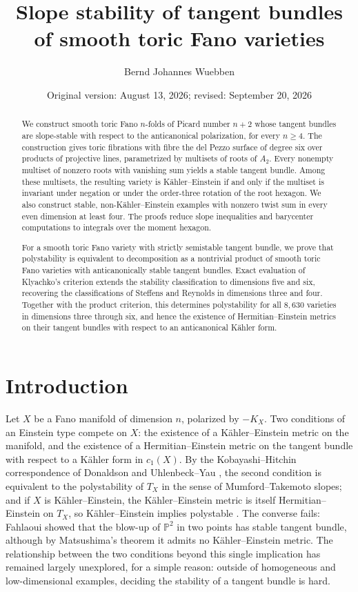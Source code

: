 \documentclass[11pt]{amsart}
\title[Stability of tangent bundles of smooth toric Fanos]{Slope stability
of tangent bundles\\ of smooth toric Fano varieties}
\author{Bernd Johannes Wuebben}
\date{Original version: August 13, 2026; revised: September 20, 2026}
\theoremstyle{definition}
\theoremstyle{remark}
\newcommand{\PP}{\mathbb{P}}
\begin{document}
\begin{abstract}
We construct smooth toric Fano $n$-folds of Picard number $n+2$ whose
tangent bundles are slope-stable with respect to the anticanonical
polarization, for every $n\ge4$. The construction gives toric fibrations
with fibre the del Pezzo surface of degree six over products of projective
lines, parametrized by multisets of roots of $A_2$. Every nonempty multiset
of nonzero roots with vanishing sum yields a stable tangent bundle. Among
these multisets, the resulting variety is K\"ahler--Einstein if and only
if the multiset is invariant under negation or under the order-three
rotation of the root hexagon. We also construct stable,
non-K\"ahler--Einstein examples with nonzero twist sum in every even
dimension at least four. The proofs reduce slope inequalities and
barycenter computations to integrals over the moment hexagon.

For a smooth toric Fano variety with strictly semistable tangent bundle,
we prove that polystability is equivalent to decomposition as a nontrivial
product of smooth toric Fano varieties with anticanonically stable tangent
bundles. Exact evaluation of Klyachko's criterion extends the stability
classification to dimensions five and six, recovering the classifications
of Steffens and Reynolds in dimensions three and four. Together with the
product criterion, this determines polystability for all $8{,}630$
varieties in dimensions three through six, and hence the existence of
Hermitian--Einstein metrics on their tangent bundles with respect to an
anticanonical K\"ahler form.
\end{abstract}

\maketitle

\section{Introduction}

Let $X$ be a Fano manifold of dimension $n$, polarized by $-K_X$. Two
conditions of an Einstein type compete on $X$: the existence of a
K\"ahler--Einstein metric on the manifold, and the existence of a
Hermitian--Einstein metric on the tangent bundle with respect to a K\"ahler
form in $c_1(X)$. By the Kobayashi--Hitchin correspondence of
Donaldson and Uhlenbeck--Yau \cite{Donaldson1985,UhlenbeckYau1986}, the
second condition is equivalent to the polystability of $T_X$ in the sense
of Mumford--Takemoto slopes; and if $X$ is K\"ahler--Einstein, the
K\"ahler--Einstein metric is itself Hermitian--Einstein on $T_X$, so
K\"ahler--Einstein implies polystable
\cite{Kobayashi1987,Lubke1983}. The converse fails: Fahlaoui
\cite{Fahlaoui1989} showed that the blow-up of $\PP^2$ in two points has
stable tangent bundle, although by Matsushima's theorem
\cite{Matsushima1957} it admits no K\"ahler--Einstein metric. The
relationship between the two conditions beyond this single implication has
remained largely unexplored, for a simple reason: outside of homogeneous
and low-dimensional examples, deciding the stability of a tangent bundle
is hard.
\end{document}
